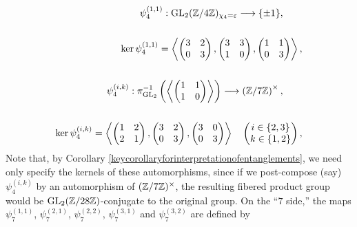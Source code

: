 \begin{equation} \label{definitionoflevel28fiberings}
\begin{split}
\psi_4^{(1,1)} : \operatorname{GL}_2(\mathbb{Z}/4\mathbb{Z})_{\chi_4 = \varepsilon} \longrightarrow \{ \pm 1 \}, \quad\quad \\
\\
\ker \psi_4^{(1,1)} = \left\langle \begin{pmatrix} 3 & 2 \\ 0 & 3 \end{pmatrix}, \begin{pmatrix} 3 & 3 \\ 1 & 0 \end{pmatrix}, \begin{pmatrix} 1 & 1 \\ 0 & 3 \end{pmatrix} \right\rangle, \\
\\
\psi_4^{(i,k)} : \pi_{\operatorname{GL}_2}^{-1} \left( \left\langle \begin{pmatrix} 1 & 1 \\ 1 & 0 \end{pmatrix} \right\rangle \right) \longrightarrow \left( \mathbb{Z}/7\mathbb{Z} \right)^\times, \quad\quad \\
\\
\ker \psi_4^{(i,k)} = \left\langle \begin{pmatrix} 1 & 2 \\ 2 & 1 \end{pmatrix}, \begin{pmatrix} 3 & 2 \\ 0 & 3 \end{pmatrix}, \begin{pmatrix} 3 & 0 \\ 0 & 3 \end{pmatrix} \right\rangle \quad \begin{pmatrix} i \in \{2, 3 \} \\ k \in \{1, 2 \} \end{pmatrix},
\end{split}
\end{equation}
Note that, by Corollary \ref{keycorollaryforinterpretationofentanglements}, we need only specify the kernels of these automorphisms, since if we post-compose (say) 
$\psi_4^{(i,k)}$ by an automorphism of $(\mathbb{Z}/7\mathbb{Z})^\times$, the resulting fibered product group would be $\operatorname{GL}_2(\mathbb{Z}/28\mathbb{Z})$-conjugate to the original group.
On the ``$7$ side,'' the maps $\psi_7^{(1,1)}$, $\psi_7^{(2,1)}$, $\psi_7^{(2,2)}$, $\psi_7^{(3,1)}$ and $\psi_7^{(3,2)}$ are defined by
